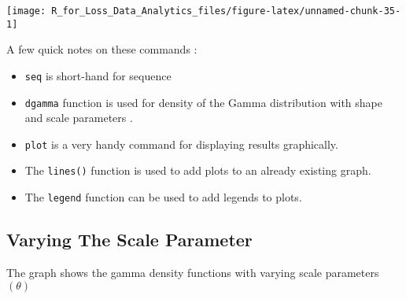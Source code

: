 \documentclass[]{book}
\providecommand{\tightlist}{%
  \setlength{\itemsep}{0pt}\setlength{\parskip}{0pt}}
\theoremstyle{definition}
\theoremstyle{definition}
\theoremstyle{definition}
\theoremstyle{remark}
\begin{document}
\begin{center}\texttt{[image: R\_for\_Loss\_Data\_Analytics\_files/figure-latex/unnamed-chunk-35-1]} \end{center}

A few quick notes on these commands :

\begin{itemize}
\tightlist
\item
  \texttt{seq} is short-hand for sequence
\item
  \texttt{dgamma} function is used for density of the Gamma distribution
  with shape and scale parameters .
\item
  \texttt{plot} is a very handy command for displaying results
  graphically.
\item
  The \texttt{lines()} function is used to add plots to an already
  existing graph.
\item
  The \texttt{legend} function can be used to add legends to plots.
\end{itemize}

\subsection{Varying The Scale
Parameter}\label{varying-the-scale-parameter}

The graph shows the gamma density functions with varying scale
parameters \((\theta)\)
\end{document}
